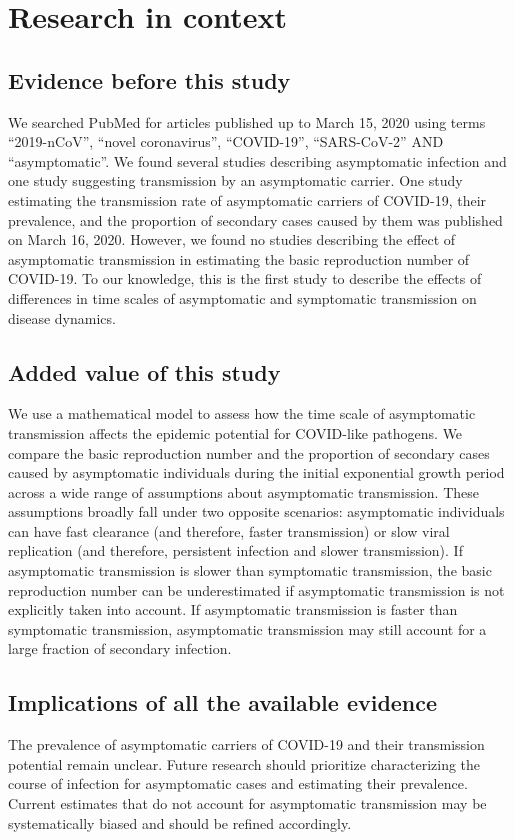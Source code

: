 \section*{Research in context}

\subsection*{Evidence before this study}

We searched PubMed for articles published up to March 15, 2020 using terms ``2019-nCoV'', ``novel coronavirus'', ``COVID-19'', ``SARS-CoV-2'' AND ``asymptomatic''. We found several studies describing asymptomatic infection and one study suggesting transmission by an asymptomatic carrier. 
One study estimating the transmission rate of asymptomatic carriers of COVID-19, their prevalence, and the proportion of secondary cases caused by them was published on March 16, 2020.
However, we found no studies describing the effect of asymptomatic transmission in estimating the basic reproduction number of COVID-19.
To our knowledge, this is the first study to describe the effects of differences in time scales of asymptomatic and symptomatic transmission on disease dynamics.

\subsection*{Added value of this study}

We use a mathematical model to assess how the time scale of asymptomatic transmission affects the epidemic potential for COVID-like pathogens.
We compare the basic reproduction number and the proportion of secondary cases caused by asymptomatic individuals during the initial exponential growth period across a wide range of assumptions about asymptomatic transmission.
These assumptions broadly fall under two opposite scenarios: asymptomatic individuals can have fast clearance (and therefore, faster transmission) or slow viral replication (and therefore, persistent infection and slower transmission).
If asymptomatic transmission is slower than symptomatic transmission, the basic reproduction number can be underestimated if asymptomatic transmission is not explicitly taken into account.
If asymptomatic transmission is faster than symptomatic transmission, asymptomatic transmission may still account for a large fraction of secondary infection.

\subsection*{Implications of all the available evidence}

The prevalence of asymptomatic carriers of COVID-19 and their transmission potential remain unclear. 
Future research should prioritize characterizing the course of infection for asymptomatic cases and estimating their prevalence.
Current estimates that do not account for asymptomatic transmission may be systematically biased and should be refined accordingly.
